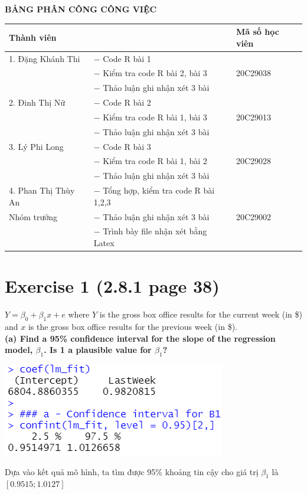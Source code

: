 \documentclass[a4paper]{article}
\theoremstyle{nonumberplain}
\begin{document}
\newpage
\thispagestyle{empty}
\begin{center}
\textbf{\large{BẢNG PHÂN CÔNG CÔNG VIỆC}\\}
\vspace{1cm}
\begin{tabular}{|m{4.5cm}||m{8cm}|m{3.5cm}|} 
\hline
\textbf{Thành viên} & \centering{\textbf{Công việc}} & \textbf{Mã số học viên}\\
\hline
1. Đặng Khánh Thi & $-$ Code R bài 1& \\
& $-$ Kiểm tra code R bài 2, bài 3 & 20C29038 \\
& $-$ Thảo luận ghi nhận xét 3 bài & \\
\hline
2. Đinh Thị Nữ  & $-$ Code R bài 2& \\
& $-$ Kiểm tra code R bài 1, bài 3& 20C29013\\
& $-$ Thảo luận ghi nhận xét 3 bài& \\
\hline 
3. Lý Phi Long & $-$ Code R bài 3& \\
& $-$ Kiểm tra code R bài 1, bài 2& 20C29028\\
& $-$ Thảo luận ghi nhận xét 3 bài& \\
\hline
4. Phan Thị Thùy An & $-$ Tổng hợp, kiểm tra code R bài 1,2,3 & \\
Nhóm trưởng & $-$ Thảo luận ghi nhận xét 3 bài & 20C29002 \\
& $-$ Trình bày file nhận xét bằng Latex & \\
\hline
\end{tabular}
\end{center}

\newpage
\section*{Exercise 1 (2.8.1 page 38)}
$Y = \beta_0 + \beta_1 x + e$ where $Y$ is the gross box
office results for the current week (in \$) and $x$ is the gross box office results for the
previous week (in \$).\\
\textbf{(a) Find a 95\% confidence interval for the slope of the regression model, $\beta_1$. Is 1 a plausible value for $\beta_1$?}
\begin{center}
\includegraphics[scale = 0.8]{1a.PNG} 
\end{center}
Dựa vào kết quả mô hình, ta tìm được 95\% khoảng tin cậy cho giá trị $\beta_1$ là  $[0.9515 ; 1.0127]$
\end{document}
